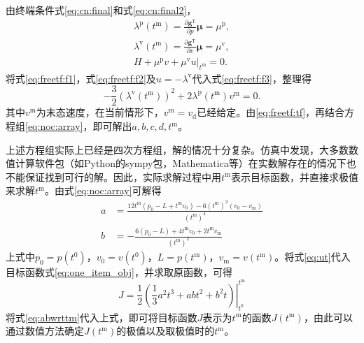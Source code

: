 由终端条件式\ref{eq:cn:final}和式\ref{eq:cn:final2}，
\begin{align}
\lambda^\mathrm{p}(t^\mathrm{m})=\frac{\partial \bm{g}^\mathrm{T}}{\partial p}\bm{\mu}=\mu^\mathrm{p},\label{eq:freetf:f1}\\
\lambda^\mathrm{v}(t^\mathrm{m})=\frac{\partial \bm{g}^\mathrm{T}}{\partial v}\bm{\mu}=\mu^\mathrm{v},\label{eq:freetf:f2}\\
\left. H+\mu^\mathrm{p}v+\mu^\mathrm{v}u\right|_{t^\mathrm{m}}=0.\label{eq:freetf:f3}
\end{align}
将式\ref{eq:freetf:f1}，式\ref{eq:freetf:f2}及$u=-\lambda^\mathrm{v}$代入式\ref{eq:freetf:f3}，整理得
\begin{equation}
-\frac32(\lambda^\mathrm{v}(t^\mathrm{m}))^2+2\lambda^\mathrm{p}(t^\mathrm{m})v^\mathrm{m}=0.
\label{eq:freetf:tf}
\end{equation}
其中$v^\mathrm{m}$为末态速度，在当前情形下，$v^\mathrm{m}=v_\mathrm{d}$已经给定。由\ref{eq:freetf:tf}，再结合方程组\ref{eq:noc:array}，即可解出$a,b,c,d,t^\mathrm{m}$。

上述方程组实际上已经是四次方程组，解的情况十分复杂。仿真中发现，大多数数值计算软件包（如{\ttfamily Python}的{\ttfamily sympy}包，{\ttfamily Mathematica}等）在实数解存在的情况下也不能保证找到可行的解。因此，实际求解过程中用$t^\mathrm{m}$表示目标函数，并直接求极值来求解$t^\mathrm{m}$。由式\ref{eq:noc:array}可解得
\begin{equation}
\begin{aligned}
a &= \frac{12t^\mathrm{m} (p_0 - L + t^\mathrm{m}v_0) - 6(t^\mathrm{m})^2(v_0 - v_\mathrm{m})}{(t^\mathrm{m})^4}\\
b &= -\frac{6(p_0 - L) + 4t^\mathrm{m}v_0 + 2t^\mathrm{m}v_\mathrm{m}}{(t^\mathrm{m})^2}
\end{aligned}
\label{eq:abwrttm}
\end{equation}
上式中$p_0=p(t^0)$，$v_0=v(t^0)$，$L=p(t^\mathrm{m})$，$v_\mathrm{m}=v(t^\mathrm{m})$。将式\ref{eq:ut}代入目标函数式\ref{eq:one_item_obj}，并求取原函数，可得
\begin{equation}
J=\left.\frac12(\frac13a^2t^3+abt^2+b^2t)\right|^{t^\mathrm{m}}_{t^0}
\label{eq:tmopt}
\end{equation}
将式\ref{eq:abwrttm}代入上式，即可将目标函数$J$表示为$t^\mathrm{m}$的函数$J(t^\mathrm{m})$，由此可以通过数值方法确定$J(t^\mathrm{m})$的极值以及取极值时的$t^\mathrm{m}$。


